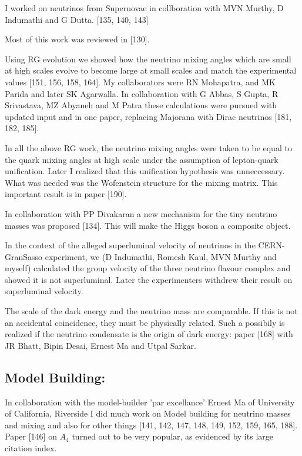 I worked on neutrinos from Supernovae in collboration with MVN Murthy, D 
Indumathi and G Dutta. [135, 140, 143]

Most of this work was reviewed in [130].

Using RG evolution we showed how the neutrino mixing angles which are 
small at high scales evolve to become large at small scales and match 
the experimental values [151, 156, 158, 164]. My collaborators were RN 
Mohapatra, and MK Parida and later SK Agarwalla. In collaboration with G 
Abbas, S Gupta, R Srivastava, MZ Abyaneh and M Patra these calculations 
were pursued with updated input and in one paper, replacing Majorana with 
Dirac neutrinos [181, 182, 185].

In all the above RG work, the neutrino mixing angles were taken to be 
equal to the quark mixing angles at high scale under the assumption of 
lepton-quark unification. Later I realized that this unification 
hypothesis was unneccessary. What was needed was the Wofenstein 
structure for the mixing matrix. This impor\-tant result is in paper 
[190].

In collaboration with PP Divakaran a new mechanism for the tiny neutrino 
masses was proposed [134]. This will make the Higgs boson a composite 
object.

In the context of the alleged superluminal velocity of neutrinos in the 
CERN-GranSasso experiment, we (D Indumathi, Ro\-mesh Kaul, MVN Murthy and 
myself) calculated the group velocity of the three neutrino flavour 
complex and showed it is not superluminal. Later the experimenters 
withdrew their result on superluminal velocity.

The scale of the dark energy and the neutrino mass are comparable. If 
this is not an accidental coincidence, they must be physically related. 
Such a possibily is realized if the neutrino condensate is the origin of 
dark energy: paper [168] with JR Bha\-tt, Bipin Desai, Ernest Ma and Utpal 
Sarkar.

\subsection*{Model Building:}

In collaboration with the model-builder 'par excellance' Ernest Ma of 
University of California, Riverside I did much work on Model building 
for neutrino masses and mixing and also for other things 
[141, 142, 147, 148, 149, 152, 159, 165, 188]. Paper [146] on $A_4$ turned out to 
be very popular, as evidenced by its large citation index.

